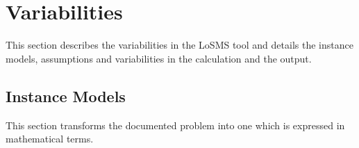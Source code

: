 \documentclass[12pt]{article}
\newcommand{\famname}{LoSMS} %
\begin{document}

\section{Variabilities} \label{Sec_Variabilities} 

This section describes the variabilities in the \famname{} tool and details the 
instance models, assumptions and variabilities in the calculation and the 
output.

\subsection{Instance Models} \label{sec_instance}   

This section transforms the documented problem into one which is expressed in 
mathematical terms.

~\newline
\end{document}
